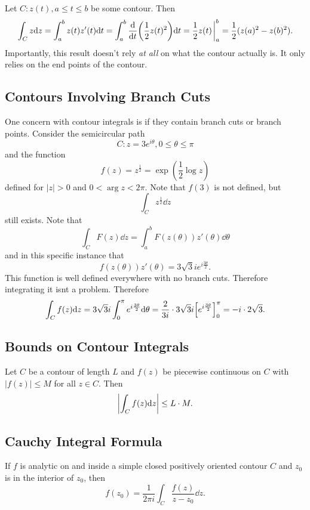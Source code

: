 \documentclass[../notes.tex]{subfiles}
\begin{document}
\begin{example}
    Let $C : z(t), a \leq t \leq b$ be some contour. Then
    \[
        \int_C z \dd z = \int_a^b z(t) z'(t) \dd t =  \int_a^b \dv{t} \qty(\frac{1}{2} z(t)^2) \dd t = \frac{1}{2} z(t) \eval_a^b = \frac{1}{2} (z(a)^2 - z(b)^2)
    .\]
    Importantly, this result doesn't rely \textit{at all} on what the contour actually is. It only relies on the end points of the contour.
\end{example}

\subsection{Contours Involving Branch Cuts}

One concern with contour integrals is if they contain branch cuts or branch points. Consider the semicircular path
\[
    C : z = 3 e^{i \theta}, 0 \leq \theta \leq \pi
\]
and the function
\[
    f(z) = z^{\frac{1}{2}} = \exp(\frac{1}{2} \log z)
\]
defined for $|z| > 0$ and $0 < \arg z < 2 \pi$. Note that $f(3)$ is not defined, but
\[
    \int_C z^{\frac{1}{2}} \dd z
\]
still exists. Note that
\[
    \int_C F(z) \dd z = \int_a^b F(z(\theta)) z'(\theta) \dd \theta
\]
and in this specific instance that
\[
    f(z(\theta)) z'(\theta) = 3 \sqrt{3} i e^{i \frac{3 \theta}{2}}
.\]
This function is well defined everywhere with no branch cuts. Therefore integrating it isnt a problem. Therefore
\[
    \int_C f(z) \dd z = 3 \sqrt{3} i \int_0^\pi e^{i \frac{3 \theta}{2}} \dd \theta = \frac{2}{3i} \cdot 3 \sqrt{3} i \qty[e^{i \frac{3 \theta}{2}}]_0^\pi = - i \cdot 2 \sqrt{3}
.\]

\subsection{Bounds on Contour Integrals}

\begin{theorem}
    Let $C$ be a contour of length $L$ and $f(z)$ be piecewise continuous on $C$ with $|f(z)| \leq M$ for all $z \in C$. Then
    \[
        \qty|\int_C f(z) \dd z| \leq L \cdot M
    .\]
\end{theorem}

\subsection{Cauchy Integral Formula}
\begin{theorem}
    \label{thm:cif}
    If $f$ is analytic on and inside a simple closed positively oriented contour $C$ and $z_0$ is in the interior of $z_0$, then
    \[
        f(z_0) = \frac{1}{2 \pi i} \int_C \frac{f(z)}{z - z_0} \dd z
    .\]
\end{theorem}
\end{document}
